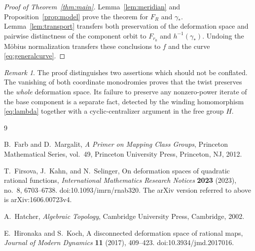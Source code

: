 \documentclass[11pt]{article}
\theoremstyle{definition}
\theoremstyle{remark}
\newtheorem{remark}[theorem]{Remark}
\begin{document}
\begin{proof}[Proof of Theorem~\ref{thm:main}]
Lemma~\ref{lem:meridian} and Proposition~\ref{prop:model} prove the
theorem for $F_R$ and $\gamma_*$.
Lemma~\ref{lem:transport} transfers both preservation of the
deformation space and pairwise distinctness of the component orbit
to $F_{r_0}$ and $h^{-1}(\gamma_*)$.
Undoing the M\"obius normalization transfers these conclusions to
$f$ and the curve \eqref{eq:generalcurve}.
\end{proof}

\begin{remark}
The proof distinguishes two assertions which should not be conflated.
The vanishing of both coordinate monodromies proves that the twist
preserves the \emph{whole} deformation space.
Its failure to preserve any nonzero-power iterate of the base
component is a separate fact, detected by the winding homomorphism
\eqref{eq:lambda} together with a cyclic-centralizer argument in the
free group $H$.
\end{remark}

\begin{thebibliography}{9}

B.~Farb and D.~Margalit,
\emph{A Primer on Mapping Class Groups},
Princeton Mathematical Series, vol.~49,
Princeton University Press, Princeton, NJ, 2012.

T.~Firsova, J.~Kahn, and N.~Selinger,
On deformation spaces of quadratic rational functions,
\emph{International Mathematics Research Notices}
\textbf{2023} (2023), no.~8, 6703--6738.
doi:10.1093/imrn/rnab320.
The arXiv version referred to above is
arXiv:1606.00723v4.

A.~Hatcher,
\emph{Algebraic Topology},
Cambridge University Press, Cambridge, 2002.

E.~Hironaka and S.~Koch,
A disconnected deformation space of rational maps,
\emph{Journal of Modern Dynamics}
\textbf{11} (2017), 409--423.
doi:10.3934/jmd.2017016.

\end{thebibliography}
\end{document}
